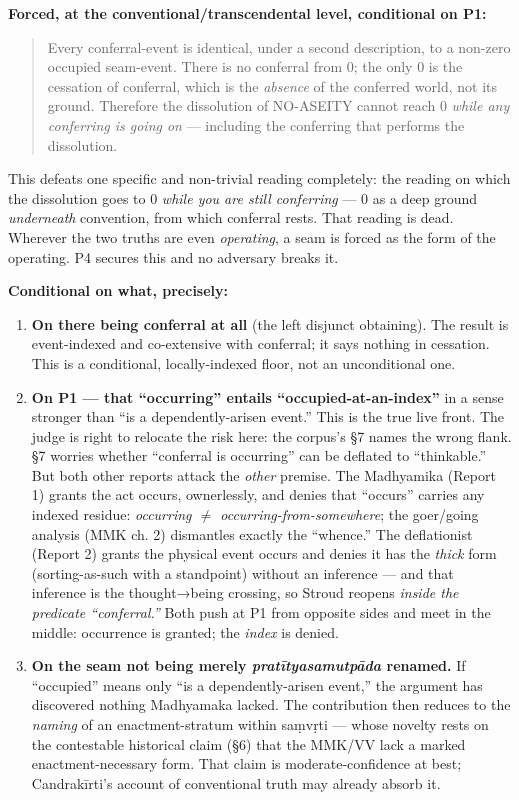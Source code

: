 \documentclass[11pt]{article}
\begin{document}
\textbf{Forced, at the conventional/\allowbreak{}transcendental level, conditional on P1:}

\begin{quote}
Every conferral-event is identical, under a second description, to a non-zero occupied seam-event. There is no conferral from 0; the only 0 is the cessation of conferral, which is the \emph{absence} of the conferred world, not its ground. Therefore the dissolution of NO-ASEITY cannot reach 0 \emph{while any conferring is going on} — including the conferring that performs the dissolution.
\end{quote}

This defeats one specific and non-trivial reading completely: the reading on which the dissolution goes to 0 \emph{while you are still conferring} — 0 as a deep ground \emph{underneath} convention, from which conferral rests. That reading is dead. Wherever the two truths are even \emph{operating}, a seam is forced as the form of the operating. P4 secures this and no adversary breaks it.

\textbf{Conditional on what, precisely:}

\begin{enumerate}
\item \textbf{On there being conferral at all} (the left disjunct obtaining). The result is event-indexed and co-extensive with conferral; it says nothing in cessation. This is a conditional, locally-indexed floor, not an unconditional one.
\item \textbf{On P1 — that ``occurring'' entails ``occupied-at-an-index''} in a sense stronger than ``is a dependently-arisen event.'' This is the true live front. The judge is right to relocate the risk here: the corpus's §7 names the wrong flank. §7 worries whether ``conferral is occurring'' can be deflated to ``thinkable.'' But both other reports attack the \emph{other} premise. The Madhyamika (Report 1) grants the act occurs, ownerlessly, and denies that ``occurs'' carries any indexed residue: \emph{occurring \ensuremath{\neq} occurring-from-somewhere}; the goer/\allowbreak{}going analysis (MMK ch. 2) dismantles exactly the ``whence.'' The deflationist (Report 2) grants the physical event occurs and denies it has the \emph{thick} form (sorting-as-such with a standpoint) without an inference — and that inference is the thought→being crossing, so Stroud reopens \emph{inside the predicate ``conferral.''} Both push at P1 from opposite sides and meet in the middle: occurrence is granted; the \emph{index} is denied.
\item \textbf{On the seam not being merely \emph{pratītyasamutpāda} renamed.} If ``occupied'' means only ``is a dependently-arisen event,'' the argument has discovered nothing Madhyamaka lacked. The contribution then reduces to the \emph{naming} of an enactment-stratum within saṃvṛti — whose novelty rests on the contestable historical claim (§6) that the MMK/\allowbreak{}VV lack a marked enactment-necessary form. That claim is moderate-confidence at best; Candrakīrti's account of conventional truth may already absorb it.
\end{enumerate}
\end{document}

